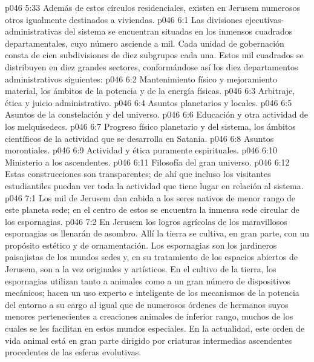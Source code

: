 \vs p046 5:33 \pc {} Además de estos círculos residenciales, existen en Jerusem numerosos otros igualmente destinados a viviendas.
\vs p046 6:1 Las divisiones ejecutivas\hyp{}administrativas del sistema se encuentran situadas en los inmensos cuadrados departamentales, cuyo número asciende a mil. Cada unidad de gobernación consta de cien subdivisiones de diez subgrupos cada una. Estos mil cuadrados se distribuyen en diez grandes sectores, conformándose así los diez departamentos administrativos siguientes:
\vs p046 6:2 Mantenimiento físico y mejoramiento material, los ámbitos de la potencia y de la energía físicas.
\vs p046 6:3 Arbitraje, ética y juicio administrativo.
\vs p046 6:4 Asuntos planetarios y locales.
\vs p046 6:5 Asuntos de la constelación y del universo.
\vs p046 6:6 Educación y otra actividad de los melquisedecs.
\vs p046 6:7 Progreso físico planetario y del sistema, los ámbitos científicos de la actividad que se desarrolla en Satania.
\vs p046 6:8 Asuntos morontiales.
\vs p046 6:9 Actividad y ética puramente espirituales.
\vs p046 6:10 Ministerio a los ascendentes.
\vs p046 6:11 Filosofía del gran universo.
\vs p046 6:12 \pc Estas construcciones son transparentes; de ahí que incluso los visitantes estudiantiles puedan ver toda la actividad que tiene lugar en relación al sistema.
\vs p046 7:1 Los mil  de Jerusem dan cabida a los seres nativos de menor rango de este planeta sede; en el centro de estos se encuentra la inmensa sede circular de los espornagias.
\vs p046 7:2 En Jerusem los logros agrícolas de los maravillosos espornagias os llenarán de asombro. Allí la tierra se cultiva, en gran parte, con un propósito estético y de ornamentación. Los espornagias son los jardineros paisajistas de los mundos sedes y, en su tratamiento de los espacios abiertos de Jerusem, son a la vez originales y artísticos. En el cultivo de la tierra, los espornagias utilizan tanto a animales como a un gran número de dispositivos mecánicos; hacen un uso experto e inteligente de los mecanismos de la potencia del entorno a su cargo al igual que de numerosos órdenes de hermanos suyos menores pertenecientes a creaciones animales de inferior rango, muchos de los cuales se les facilitan en estos mundos especiales. En la actualidad, este orden de vida animal está en gran parte dirigido por criaturas intermedias ascendentes procedentes de las esferas evolutivas.
